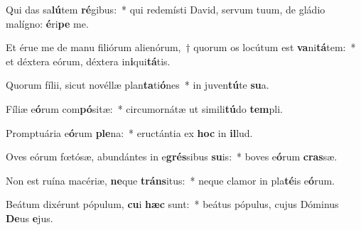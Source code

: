 \item Qui das sa\textbf{lú}tem \textbf{ré}gibus:~* qui redemísti David, servum tuum, de gládio malígno: \textbf{é}ri\textbf{pe} me.
\item Et érue me de manu filiórum alienórum,~† quorum os locútum est \textbf{va}ni\textbf{tá}tem:~* et déxtera eórum, déxtera in\textbf{i}qui\textbf{tá}tis.
\item Quorum fílii, sicut novéllæ plan\textbf{ta}ti\textbf{ó}nes~* in juven\textbf{tú}te \textbf{su}a.
\item Fíliæ e\textbf{ó}rum com\textbf{pó}sitæ:~* circumornátæ ut simili\textbf{tú}do \textbf{tem}pli.
\item Promptuária e\textbf{ó}rum \textbf{ple}na:~* eructántia ex \textbf{hoc} in \textbf{il}lud.
\item Oves eórum fœtósæ, abundántes in e\textbf{grés}sibus \textbf{su}is:~* boves e\textbf{ó}rum \textbf{cras}sæ.
\item Non est ruína macériæ, \textbf{ne}que \textbf{tráns}itus:~* neque clamor in pla\textbf{té}is e\textbf{ó}rum.
\item Beátum dixérunt pópulum, \textbf{cu}i \textbf{hæc} sunt:~* beátus pópulus, cujus Dóminus \textbf{De}us \textbf{e}jus.
